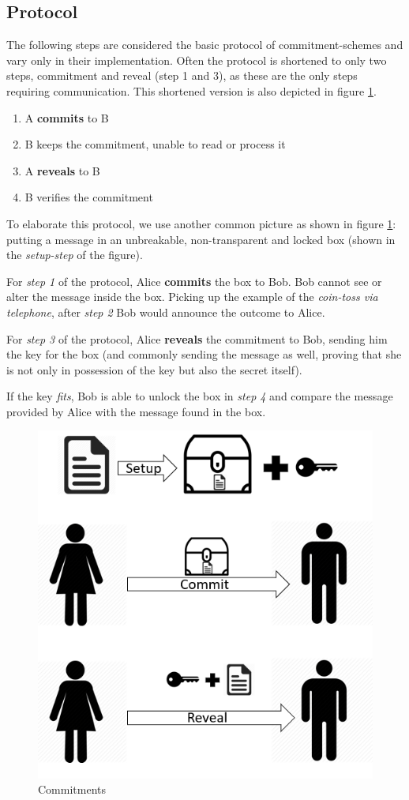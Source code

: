 \subsection{Protocol}
The following steps are considered the basic protocol of commitment-schemes and vary only in their implementation. Often the protocol is shortened to only two steps, commitment and reveal (step 1 and 3), as these are the only steps requiring communication. This shortened version is also depicted in figure \ref{fig:protocoll}.  
\begin{enumerate}
	\item A \textbf{commits} to B
	\item B keeps the commitment, unable to read or process it
	\item A \textbf{reveals} to B
	\item B verifies the commitment 
\end{enumerate}
To elaborate this protocol, we use another common picture as shown in figure \ref{fig:protocoll}: putting a message in an unbreakable, non-transparent and locked box (shown in the \textit{setup-step} of the figure).

For \textit{step 1} of the protocol, Alice \textbf{commits} the box to Bob. Bob cannot see or alter the message inside the box. Picking up the example of the \textit{coin-toss via telephone}, after \textit{step 2} Bob would announce the outcome to Alice.
 
For \textit{step 3} of the protocol, Alice \textbf{reveals} the commitment to Bob, sending him the key for the box (and commonly sending the message as well, proving that she is not only in possession of the key but also the secret itself). 

If the key \textit{fits}, Bob is able to unlock the box in \textit{step 4} and compare the message provided by Alice with the message found in the box. 
\begin{figure}
	\centering
	\includegraphics[width=0.8\linewidth]{Images/protocoll}
	\caption[Commitments]{Commitments}
	\label{fig:protocoll}
\end{figure}

